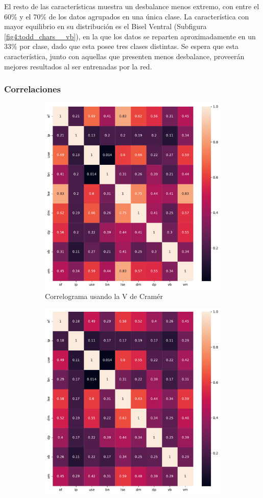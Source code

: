 El resto de las características muestra un desbalance menos extremo, con entre el 60\% y el 70\% de los datos agrupados en una única clase. La característica con mayor equilibrio en su distribución es el Bisel Ventral (Subfigura \ref{fig4:todd_chars__vb}), en la que los datos se reparten aproximadamente en un 33\% por clase, dado que esta posee tres clases distintas. Se espera que esta característica, junto con aquellas que presenten menos desbalance, proveerán mejores resultados al ser entrenadas por la red.

\subsubsection{Correlaciones}

\begin{figure}[p]
    \centering
    \begin{subfigure}{\textwidth}
        \centering
        \includegraphics[width=0.7\linewidth]{../../scripts/eda/assoc_plot_cramersv.pdf}
        \caption{Correlograma usando la V de Cramér}
        \label{fig4:todd_chars__cramersv}
    \end{subfigure}
    \begin{subfigure}{\textwidth}
        \centering
        \includegraphics[width=0.7\linewidth]{../../scripts/eda/assoc_plot_tschuprow.pdf}

\end{subfigure}
\end{figure}
